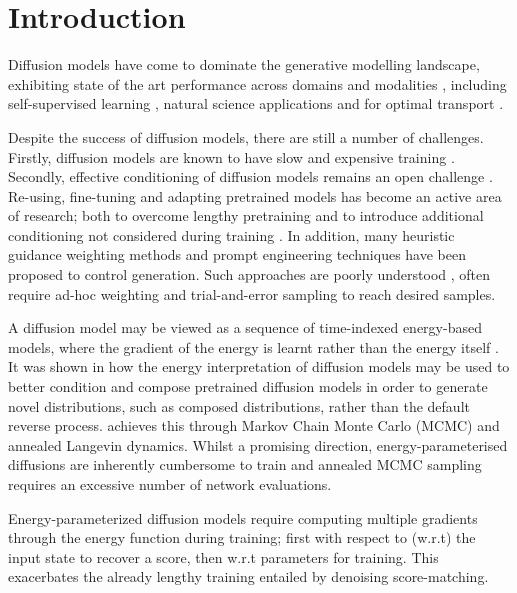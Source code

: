 
\section{Introduction}

Diffusion models \citep{sohldickstein2015deep, song2020generative, song2021scorebased} have come to dominate the generative modelling landscape, exhibiting state of the art performance \citep{dhariwal2021diffusion} across domains and modalities \citep{de2022riemannian}, including self-supervised learning \citep{chen2024deconstructing}, natural science applications \citep{arts2023two} and for optimal transport \citep{debortoli2021diffusion}.

Despite the success of diffusion models, there are still a number of challenges. Firstly, diffusion models are known to have slow and expensive training \citep{jeha2024variance, zhang2023improving}. Secondly, effective conditioning of diffusion models remains an open challenge \citep{wu2024practical, zhao2024conditional}. Re-using, fine-tuning and adapting pretrained models has become an active area of research; both to overcome lengthy pretraining and to introduce additional conditioning not considered during training \citep{ye2024tfg, du2021improved}. In addition, many heuristic guidance weighting methods and prompt engineering techniques have been proposed to control generation. Such approaches are poorly understood \citep{bradley2024classifier}, often require ad-hoc weighting and trial-and-error sampling to reach desired samples. 

A diffusion model may be viewed as a sequence of time-indexed energy-based models, where the gradient of the energy is learnt rather than the energy itself \citep{song2021trainebm, salimans2021should}. It was shown in \cite{du2023reduce} how the energy interpretation of diffusion models may be used to better condition and compose pretrained diffusion models in order to generate novel distributions, such as composed distributions, rather than the default reverse process. \cite{du2023reduce}  achieves this through Markov Chain Monte Carlo (MCMC) and annealed Langevin dynamics. Whilst a promising direction, energy-parameterised diffusions are inherently cumbersome to train and annealed MCMC sampling requires an excessive number of network evaluations.

 Energy-parameterized diffusion models require computing multiple gradients through the energy function during training; first with respect to (w.r.t) the input state to recover a score, then w.r.t parameters for training. This exacerbates the already lengthy training entailed by denoising score-matching. 


